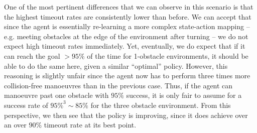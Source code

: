 One of the most pertinent differences that we can observe in this scenario is that the highest timeout rates are consistently lower than before. We can accept that since the agent is essentially re-learning a more complex state-action mapping -- e.g. meeting obstacles at the edge of the environment after turning -- we do not expect high timeout rates immediately. Yet, eventually, we do expect that if it can reach the goal $>95\%$ of the time for 1-obstacle environments, it should be able to do the same here, given a similar ``optimal'' policy. 
However, this reasoning is slightly unfair since the agent now has to perform three times more collision-free manoeuvres than in the previous case. Thus, if the agent can manoeuvre past one obstacle with $95\%$ success, it is only fair to assume for a success rate of $95\%^3 \sim 85\%$ for the three obstacle environment.
From this perspective, we then see that the policy is improving, since it does achieve over an over $90\%$ timeout rate at its best point. 

